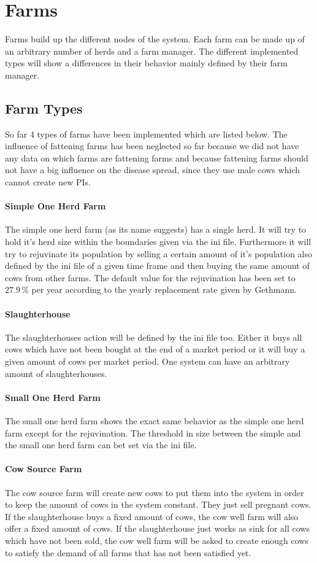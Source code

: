 \section{Farms}
Farms build up the different nodes of the system. Each farm can be made up of an arbitrary number of herds and a farm manager. The different implemented types will show a differences in their behavior mainly defined by their farm manager.
\subsection{Farm Types}
So far 4 types of farms have been implemented which are listed below. The influence of fattening farms has been neglected so far because we did not have any data on which farms are fattening farms and because fattening farms should not have a big influence on the disease spread, since they use male cows which cannot create new PIs.
\paragraph{Simple One Herd Farm}
The simple one herd farm (as its name suggests) has a single herd. It will try to hold it's herd size within the boundaries given via the ini file. Furthermore it will try to rejuvinate its population by selling a certain amount of it's population also defined by the ini file of a given time frame and then buying the same amount of cows from other farms. The default value for the rejuvination has been set to $27.9\,\%$ per year according to the yearly replacement rate given by Gethmann.
\paragraph{Slaughterhouse}
The slaughterhouses action will be defined by the ini file too. Either it buys all cows which have not been bought at the end of a market period or it will buy a given amount of cows per market period. One system can have an arbitrary amount of slaughterhouses.
\paragraph{Small One Herd Farm}
The small one herd farm shows the exact same behavior as the simple one herd farm except for the rejuvination. The threshold in size between the simple and the small one herd farm can bet set via the ini file. 
\paragraph{Cow Source Farm}
The cow source farm will create new cows to put them into the system in order to keep the amount of cows in the system constant. They just sell pregnant cows. If the slaughterhouse buys a fixed amount of cows, the cow well farm will also offer a fixed amount of cows. If the slaughterhouse just works as sink for all cows which have not been sold, the cow well farm will be asked to create enough cows to satisfy the demand of all farms that has not been satisfied yet.
